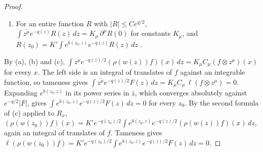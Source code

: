 \begin{proof}
\begin{enumerate}
  relation. Induction on $|\mu|$ gives (b).
\item[(c)] For an entire function $R$ with $|R|\leq Ce^{q/2}$,
  $\int\overline{z^\mu}e^{-q(z)}R(z)\,dz=K_\mu\,\partial^\mu R(0)$ for constants
  $K_\mu$, and $R(z_0)=K'\int e^{b(z_0,z)}e^{-q(z)}R(z)\,dz$ \cite{Bar61}.
\end{enumerate}
By (a), (b) and (c),
$\int\overline{z^\mu}e^{-q(z)/2}(\rho(w(z))f)(x)\,dz=K_\mu C_\mu(f\otimes z^\mu)(x)$
for every $x$. The left side is an integral of translates of $f$ against an
integrable function, so tameness gives
$\int\overline{z^\mu}e^{-q(z)/2}F(z)\,dz=K_\mu C_\mu\,\ell(f\otimes z^\mu)=0$.
Expanding $e^{b(z_0,z)}$ in its power series in $\bar z$, which converges
absolutely against $e^{-q/2}|F|$, gives
$\int e^{b(z_0,z)}e^{-q(z)/2}F(z)\,dz=0$ for every $z_0$. By the second formula
of (c) applied to $R_x$,
$(\rho(w(z_0))f)(x)=K'e^{-q(z_0)/2}\int e^{b(z_0,z)}e^{-q(z)/2}(\rho(w(z))f)(x)\,dz$,
again an integral of translates of $f$. Tameness gives
$\ell(\rho(w(z_0))f)=K'e^{-q(z_0)/2}\int e^{b(z_0,z)}e^{-q(z)/2}F(z)\,dz=0$.
\end{proof}

